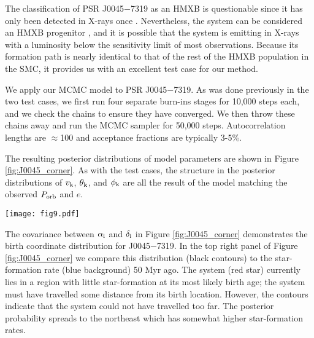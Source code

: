 \documentclass[usenatbib]{mnras}
\begin{document}
The classification of PSR J0045$-$7319 as an HMXB is questionable since it has only been detected in X-rays once \citep{galache08}. Nevertheless, the system can be considered an HMXB progenitor \citep{kaspi94}, and it is possible that the system is emitting in X-rays with a luminosity below the sensitivity limit of most observations. Because its formation path is nearly identical to that of the rest of the HMXB population in the SMC, it provides us with an excellent test case for our method.

We apply our MCMC model to PSR J0045$-$7319. As was done previously in the two test cases, we first run four separate burn-ins stages for 10,000 steps each, and we check the chains to ensure they have converged. We then throw these chains away and run the MCMC sampler for 50,000 steps. Autocorrelation lengths are $\approx$100 and acceptance fractions are typically 3-5\%. 

The resulting posterior distributions of model parameters are shown in Figure \ref{fig:J0045_corner}. As with the test cases, the structure in the posterior distributions of $v_{\rm k}$, $\theta_{\rm k}$, and $\phi_{\rm k}$ are all the result of the model matching the observed $P_{\rm orb}$ and $e$. 




\begin{figure*}
\begin{center}
\texttt{[image: fig9.pdf]}
\caption{Posterior probability distributions and their covariances when applied to the SMC pulsar binary J0045$-$7319. The top right panel shows the posterior probability distributions for the birth position (black lines) compared with the star-formation rate (color background) 50 Myr ago at the peak posterior probability for the birth of J0045$-$7319 as indicated by our model. The current position of the system (red star) is in a region of low star-formation rate, and while the posterior distribution of birth positions from our model centers around the system's current position, the posterior distribution spreads to the northeast with high star-formation rates.}
\label{fig:J0045_corner}
\end{center}
\end{figure*}

The covariance between $\alpha_{\rm i}$ and $\delta_{\rm i}$ in Figure \ref{fig:J0045_corner} demonstrates the birth coordinate distribution for J0045$-$7319. In the top right panel of Figure \ref{fig:J0045_corner} we compare this distribution (black contours) to the star-formation rate (blue background) 50 Myr ago. The system (red star) currently lies in a region with little star-formation at its most likely birth age; the system must have travelled some distance from its birth location. However, the contours indicate that the system could not have travelled too far. The posterior probability spreads to the northeast which has somewhat higher star-formation rates.
\end{document}

